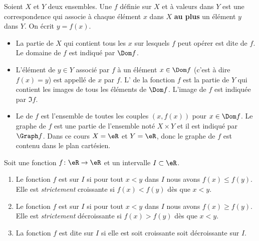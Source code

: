 \begin{definition}
  Soient $X$ et $Y$ deux ensembles. Une  $f$ définie sur $X$ et à valeurs dans $Y$ est une correspondence qui associe à chaque élément $x$ dans $X$ {\bf au plus} un élément $y$ dans $Y$. On écrit $y= f(x)$.
  \begin{itemize}
  \item La partie de $X$ qui contient tous les $x$ sur lesquels $f$ peut opérer est dite  de $f$. Le domaine de $f$ est indiqué par $\Dom f$.
  \item L'élément de $y\in Y$ associé par $f$ à un élément $x\in \Dom f$ (c'est à dire $f(x) = y$)  est appellé  de $x$ par $f$. L' de la fonction $f$ est la partie de $Y$ qui contient les images de tous les éléments de $\Dom f$. L'image de $f$ est indiquée par $\Im f$.
  \item Le  de $f$ est l'ensemble de toutes les couples $(x, f(x))$ pour $x\in \Dom f$. Le graphe de $f$ est une partie de l'ensemble noté $X\times Y$ et il est indiqué par $\Graph f$. Dans ce cours $X = \eR$ et $Y = \eR$, donc le graphe de $f$ est contenu dans le plan cartésien. 
  \end{itemize}
\end{definition}

\begin{definition}
    Soit une fonction \( f\colon \eR\to \eR\) et un intervalle \( I\subset \eR\).
    \begin{enumerate}
        \item
            Le fonction \( f\) est  sur \( I\) si pour tout \( x<y\) dans \( I\) nous avons \( f(x)\leq f(y)\). Elle est \emph{strictement} croissante si \( f(x)<f(y)\) dès que \( x<y\).
        \item
            Le fonction \( f\) est  sur \( I\) si pour tout \( x<y\) dans \( I\) nous avons \( f(x)\geq f(y)\). Elle est \emph{strictement} décroissante si \( f(x)>f(y)\) dès que \( x<y\).
        \item
            La fonction \( f\) est dite  sur \( I\) si elle est soit croissante soit décroissante sur \( I\).
    \end{enumerate}
\end{definition}

